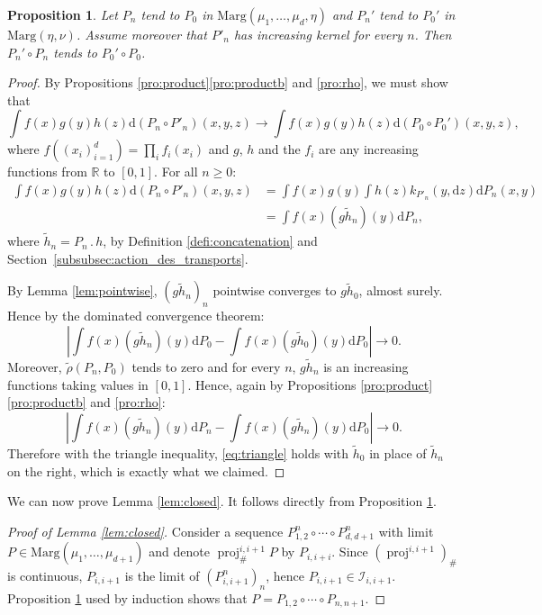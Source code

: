 \documentclass[10pt,a4paper]{article}
\newcommand{\ldot}{\mathbin{.}}
\theoremstyle{plain}
\newtheorem{pro}[them]{Proposition}
\theoremstyle{definition}
\newcommand{\dd}{\mathrm{d}}
\newcommand{\ma}{\mathrm{Marg}}
\newcommand{\R}{\mathbb{R}}
\newcommand{\pr}{\operatorname{proj}}
\begin{document}
\begin{pro}\label{pro:continuity}
Let $P_n$ tend to $P_0$ in $\ma(\mu_1,\ldots,\mu_d,\eta)$ and $P_n'$ tend to $P_0'$ in $\ma(\eta,\nu)$. Assume moreover that $P'_n$ has increasing kernel for every $n$. Then $P_n'\circ P_n$ tends to $P_0'\circ P_0$.
\end{pro}

\begin{proof}
By Propositions \ref{pro:product}\eqref{pro:productb} and \ref{pro:rho}, we must show that\vspace*{-3pt}
\[
\int f(x)g(y)h(z)\dd (P_n\circ P'_n)(x,y,z)\to \int f(x)g(y)h(z)\dd (P_0\circ P_0')(x,y,z),
\]
where $f((x_i)_{i=1}^d)=\prod_if_i(x_i)$ and $g$, $h$ and the $f_i$ are any increasing functions from $\R$ to $[0,1]$. For all $n\geqslant0$:
\begin{align*}
\int f(x)g(y)h(z)\dd (P_n\circ P'_n)(x,y,z)&=\int f(x)g(y)\int h(z) k_{P'_n}(y,\dd z)\dd P_n(x,y)\\
&=\int f(x)(g\tilde h_n)(y)\dd P_n,
\end{align*}
where $\tilde h_n=P_{n}{}\ldot h$, by Definition \ref{defi:concatenation} and Section~\ref{subsubsec:action_des_transports}.

By Lemma \ref{lem:pointwise}, $(g\tilde{h}_n)_n$ pointwise converges to $g\tilde{h}_0$, almost surely. Hence by the dominated convergence theorem:
\[\left|\int f(x)(g\tilde h_n)(y)\dd P_0-\int f(x)(g\tilde h_0)(y)\dd P_0\right|\to0.\]
Moreover, $\tilde{\rho}(P_n,P_0)$ tends to zero and for every $n$, $g\tilde h_n$ is an increasing functions taking values in $[0,1]$. Hence, again by Propositions \ref{pro:product}\eqref{pro:productb} and \ref{pro:rho}:
\begin{equation}\label{eq:triangle}
\left|\int f(x)(g \tilde h_n)(y)\dd P_n-\int f(x)(g \tilde h_n)(y)\dd P_0\right|\to0.
\end{equation}
Therefore with the triangle inequality, \eqref{eq:triangle} holds with $\tilde h_0$ in place of $\tilde h_n$ on the right,
which is exactly what we claimed.
\end{proof}

We can now prove Lemma \ref{lem:closed}. It follows directly from Proposition \ref{pro:continuity}.

\begin{proof}[Proof of Lemma \ref{lem:closed}]\label{proof:lem:closed}
Consider a sequence $P^n_{1,2}\circ\cdots\circ P^n_{d,d+1}$ with limit $P\in\ma(\mu_1,\ldots,\mu_{d+1})$ and denote $\pr^{i,i+1}_{\#}P$ by $P_{i,i+i}$. Since $(\pr^{i,i+1})_\#$ is continuous, $P_{i,i+1}$ is the limit of $(P_{i,i+1}^n)_n$, hence $P_{i,i+1}\in\mathcal{I}_{i,i+1}$. Proposition \ref{pro:continuity} used by induction shows that $P=P_{1,2}\circ\cdots\circ P_{n,n+1}$.
\end{proof}
\end{document}

